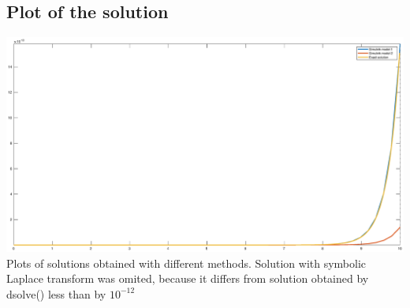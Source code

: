 \documentclass[a4paper,12pt]{article}
\begin{document}
\subsection{Plot of the solution}
\begin{center}
    \includegraphics[width=\linewidth]{totalPlot.eps}
    Plots of solutions obtained with different methods. 
    Solution with symbolic Laplace transform was omited, 
    because it differs from solution obtained by dsolve()
    less than by $10^{-12}$
\end{center}
\end{document}
